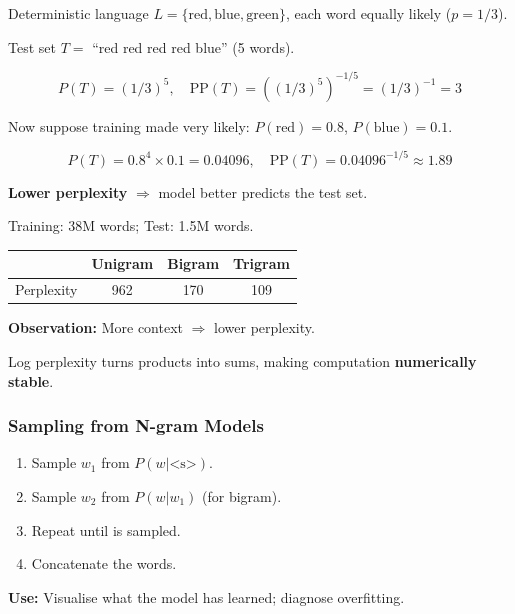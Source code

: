 \begin{exbox}
Deterministic language $L = \{\text{red}, \text{blue}, \text{green}\}$, each word equally likely ($p = 1/3$).

Test set $T = $ ``red red red red blue'' (5 words).

\[
P(T) = (1/3)^5, \quad \text{PP}(T) = ((1/3)^5)^{-1/5} = (1/3)^{-1} = 3
\]

Now suppose training made  very likely: $P(\text{red}) = 0.8$, $P(\text{blue}) = 0.1$.

\[
P(T) = 0.8^4 \times 0.1 = 0.04096, \quad \text{PP}(T) = 0.04096^{-1/5} \approx 1.89
\]

\textbf{Lower perplexity} $\Rightarrow$ model better predicts the test set.
\end{exbox}

\begin{exbox}
Training: 38M words; Test: 1.5M words.

\begin{center}
\renewcommand{\arraystretch}{1.2}
\begin{tabular}{@{} l c c c @{}}
\toprule
 & Unigram & Bigram & Trigram \\
\midrule
Perplexity & 962 & 170 & 109 \\
\bottomrule
\end{tabular}
\end{center}

\textbf{Observation:} More context $\Rightarrow$ lower perplexity.
\end{exbox}

\begin{tipbox}
Log perplexity turns products into sums, making computation \textbf{numerically stable}.
\end{tipbox}

\bigseparator

\subsubsection{Sampling from N-gram Models}

\begin{defbox}
\begin{enumerate}
  \item Sample $w_1$ from $P(w | \text{<s>})$.
  \item Sample $w_2$ from $P(w | w_1)$ (for bigram).
  \item Repeat until  is sampled.
  \item Concatenate the words.
\end{enumerate}

\textbf{Use:} Visualise what the model has learned; diagnose overfitting.
\end{defbox}

